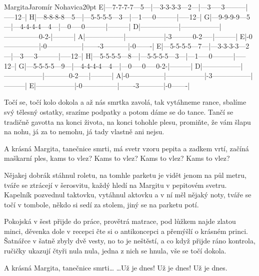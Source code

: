 \begin{song}{Margita}{Jaromír Nohavica}{20pt}
\tabs{20pt}
E|---7-7-7-7---5---|---3-3-3-3---2---|---3-----3---------|-----12--|
H|---8-8-8-8---5---|---5-5-5-5---3---|---1-----0---------|-----12--|
G|---9-9-9-9---5---|---4-4-4-4---4---|---0-----0---------|---------|
D|-----------------|-----------------|---------------0-2-|---------|
A|-----------------|-----------------|-3---------0-2-----|---------|
E|-0---------------|-0---------------|-------3-----------|-0-------|
\endtabs
\tabs{20pt}
E|---5-5-5-5---7---|---3-3-3-3---2---|---3-----3---------|-----12--|
H|---5-5-5-5---8---|---5-5-5-5---3---|---1-----0---------|-----12--|
G|---5-5-5-5---9---|---4-4-4-4---4---|---0-----0-----0-2-|---------|
D|-----------------|-----------------|-----------0-2-----|---------|
A|-0---------------|-----------------|-3-----------------|---------|
E|-----------------|-0---------------|-------3-----------|-0-------|
\endtabs

%
Točí se, točí kolo dokola a až nás smrtka zavolá, tak vytáhneme rance,
sbalíme svý tělesný ostatky, srazíme podpatky a potom dáme se do tance.
Tančí se tradičně gavotta na konci života, na konci tohohle plesu,
promiňte, že vám šlapu na nohu, já za to nemohu, já tady vlastně ani nejsu.

\chorus%
A krásná Margita, tanečnice smrti,
má svetr vzoru pepita a zadkem vrtí,
začíná maškarní ples, kams to vlez?
Kams to vlez? Kams to vlez? Kams to vlez?

%
Nějakej dobrák stáhnul roletu, na tomhle parketu je vidět jenom na půl metru,
tváře se ztrácejí v šerosvitu, každý hledí na Margitu v pepitovém svetru.
Kapelník pozvednul taktovku, vytáhnul aktovku a v ní měl nějaký noty,
tváře se točí v tombole, někdo si sedí za stolem, jiný se na parketu potí.
\repchor

%
Pokojská v šest přijde do práce, provětrá matrace, pod lůžkem najde zlatou minci,
děvenka dole v recepci čte si o antikoncepci a přemýšlí o krásném princi.
Šatnářce v šatně zbyly dvě vesty, no to je neštěstí, a co když přijde ráno kontrola,
ručičky ukazují čtyři nula nula, jedna z nich se hnula, vše se točí dokola.

\chorus%
A krásná Margita, tanečnice smrti\dots
\dots Už je dnes! Už je dnes! Už je dnes.
\end{song}
